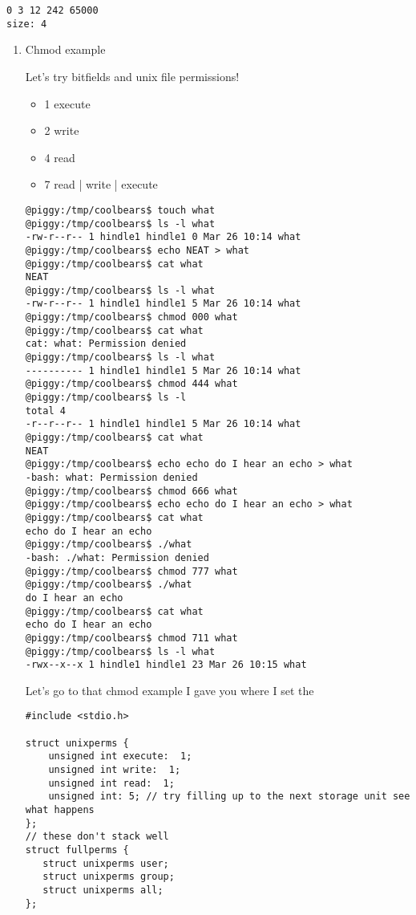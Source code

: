 \documentclass[11pt]{article}
\begin{document}
\begin{verbatim}
0 3 12 242 65000
size: 4
\end{verbatim}

\begin{enumerate}
\item Chmod example
\label{sec:orge978714}

Let's try bitfields and unix file permissions!

\begin{itemize}
\item 1 execute
\item 2 write
\item 4 read

\item 7 read | write | execute
\end{itemize}

\begin{verbatim}
@piggy:/tmp/coolbears$ touch what
@piggy:/tmp/coolbears$ ls -l what
-rw-r--r-- 1 hindle1 hindle1 0 Mar 26 10:14 what
@piggy:/tmp/coolbears$ echo NEAT > what
@piggy:/tmp/coolbears$ cat what
NEAT
@piggy:/tmp/coolbears$ ls -l what
-rw-r--r-- 1 hindle1 hindle1 5 Mar 26 10:14 what
@piggy:/tmp/coolbears$ chmod 000 what
@piggy:/tmp/coolbears$ cat what
cat: what: Permission denied
@piggy:/tmp/coolbears$ ls -l what
---------- 1 hindle1 hindle1 5 Mar 26 10:14 what
@piggy:/tmp/coolbears$ chmod 444 what
@piggy:/tmp/coolbears$ ls -l
total 4
-r--r--r-- 1 hindle1 hindle1 5 Mar 26 10:14 what
@piggy:/tmp/coolbears$ cat what
NEAT
@piggy:/tmp/coolbears$ echo echo do I hear an echo > what
-bash: what: Permission denied
@piggy:/tmp/coolbears$ chmod 666 what
@piggy:/tmp/coolbears$ echo echo do I hear an echo > what
@piggy:/tmp/coolbears$ cat what
echo do I hear an echo
@piggy:/tmp/coolbears$ ./what
-bash: ./what: Permission denied
@piggy:/tmp/coolbears$ chmod 777 what
@piggy:/tmp/coolbears$ ./what
do I hear an echo
@piggy:/tmp/coolbears$ cat what
echo do I hear an echo
@piggy:/tmp/coolbears$ chmod 711 what
@piggy:/tmp/coolbears$ ls -l what
-rwx--x--x 1 hindle1 hindle1 23 Mar 26 10:15 what
\end{verbatim}

Let's go to that chmod example I gave you where I set the 

\begin{verbatim}
#include <stdio.h>

struct unixperms {
    unsigned int execute:  1;
    unsigned int write:  1;
    unsigned int read:  1;
    unsigned int: 5; // try filling up to the next storage unit see what happens
};
// these don't stack well
struct fullperms {
   struct unixperms user;
   struct unixperms group;
   struct unixperms all;
};


\end{verbatim}
\end{enumerate}
\end{document}
